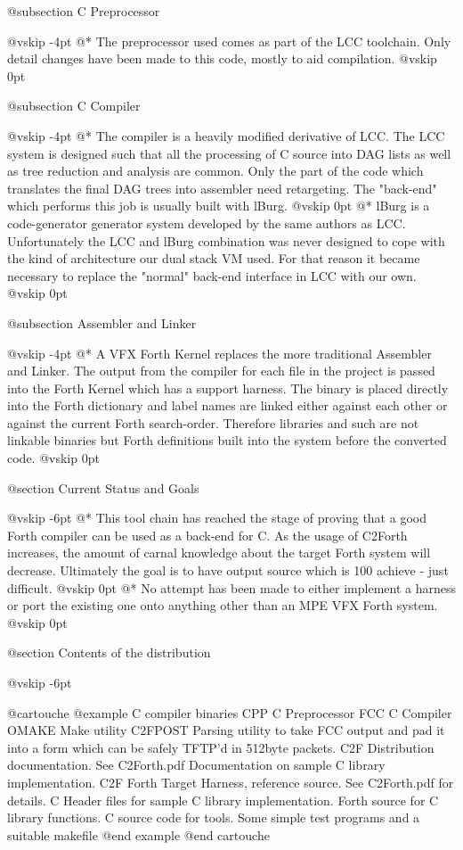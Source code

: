 @subsection C Preprocessor


@vskip -4pt
@*
The preprocessor used comes as part of the LCC toolchain.
Only detail changes have been made to this code, mostly to
aid compilation.
@vskip 0pt

@subsection C Compiler


@vskip -4pt
@*
The compiler is a heavily modified derivative of LCC. The LCC
system is designed such that all the processing of C source into
DAG lists as well as tree reduction and analysis are common. Only
the part of the code which translates the final DAG trees into
assembler need retargeting. The "back-end" which performs this job
is usually built with lBurg.
@vskip 0pt
@*
lBurg is a code-generator generator system developed by the same
authors as LCC. Unfortunately the LCC and lBurg combination was
never designed to cope with the kind of architecture our dual
stack VM used. For that reason it became necessary to replace the
"normal" back-end interface in LCC with our own.
@vskip 0pt

@subsection Assembler and Linker


@vskip -4pt
@*
A VFX Forth Kernel replaces the more traditional Assembler and
Linker. The output from the compiler for each file in the project
is passed into the Forth Kernel which has a support harness. The
binary is placed directly into the Forth dictionary and label names
are linked either against each other or against the current Forth
search-order. Therefore libraries and such are not linkable binaries
but Forth definitions built into the system before the converted
code.
@vskip 0pt

@section Current Status and Goals


@vskip -6pt
@*
This tool chain has reached the stage of proving that a good Forth
compiler can be used as a back-end for C. As the usage of C2Forth
increases, the amount of carnal knowledge about the target Forth
system will decrease. Ultimately the goal is to have output source
which is 100%
achieve - just difficult.
@vskip 0pt
@*
No attempt has been made to either implement a harness or port the
existing one onto anything other than an MPE VFX Forth system.
@vskip 0pt

@section Contents of the distribution


@vskip -6pt

@cartouche
@example
\BIN            C compiler binaries
    CPP         C Preprocessor
    FCC         C Compiler
    OMAKE       Make utility
    C2FPOST     Parsing utility to take FCC output and pad
                it into a form which can be safely TFTP'd
                in 512byte packets.
\DOC            C2F Distribution documentation.
                See C2Forth.pdf
\DOC\LIBC       Documentation on sample C library implementation.
\HARNESS        C2F Forth Target Harness, reference source.
                See C2Forth.pdf for details.
\INCLUDE        C Header files for sample C library implementation.
\LIB            Forth source for C library functions.
\SRC            C source code for tools.
\TESTS          Some simple test programs and a suitable makefile @end example
@end cartouche
